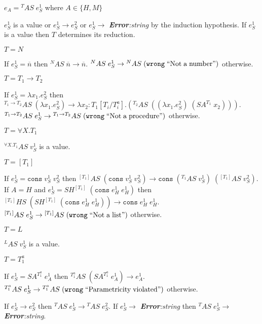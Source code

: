 \begin{case}
\label{as}
$e_{A}={^{T}A}S\;e_{S}^{1}$ where $A\in\lbrace H,M\rbrace$

$e_{S}^{1}$ is a value or $e_{S}^{1}\rightarrow e_{S}^{2}$ or $e_{S}^{1}\rightarrow$ \emph{\textbf{Error}:\;string} by the induction hypothesis.  If $e_{S}^{1}$ is a value then $T$ determines its reduction.
\begin{subcase}
$T=N$

If $e_{S}^{1}=\overline{n}$ then $^{N}AS\;\overline{n}\rightarrow\overline{n}$.  $^{N}AS\;e_{S}^{1}\rightarrow{^{N}A}S\;(\mathtt{wrong}\;\mathrm{``Not\;a\;number"})$ otherwise.
\end{subcase}
\begin{subcase}
$T=T_{1}\rightarrow T_{2}$

If $e_{S}^{1}=\lambda x_{1}.e_{S}^{2}$ then $^{T_{1}\rightarrow T_{2}}AS\;(\lambda x_{1}.e_{S}^{2})\rightarrow\lambda x_{2}:T_{1}[T_{i}/T^{a}_{i}].(^{T_{2}}AS\;((\lambda x_{1}.e_{S}^{2})\;(SA^{T_{1}}\;x_{2})))$.  $^{T_{1}\rightarrow T_{2}}AS\;e_{S}^{1}\rightarrow{^{T_{1}\rightarrow T_{2}}A}S\;(\mathtt{wrong}\;\mathrm{``Not\;a\;procedure"})$ otherwise.
\end{subcase}
\begin{subcase}
$T=\forall X.T_{1}$

$^{\forall X.T_{1}}AS\;v_{S}^{1}$ is a value.
\end{subcase}
\begin{subcase}
$T=[T_{1}]$

If $e_{S}^{1}=\mathtt{cons}\;v_{S}^{1}\;v_{S}^{2}$ then $^{[T_{1}]}AS\;(\mathtt{cons}\;v_{S}^{1}\;v_{S}^{2})\rightarrow\mathtt{cons}\;(^{T_{1}}AS\;v_{S}^{1})\;(^{[T_{1}]}AS\;v_{S}^{2})$.  If $A=H$ and $e_{S}^{1}=SH^{[T_{1}]}\;(\mathtt{cons}\;e_{H}^{1}\;e_{H}^{1})$ then $^{[T_{1}]}HS\;(SH^{[T_{1}]}\;(\mathtt{cons}\;e_{H}^{1}\;e_{H}^{1}))\rightarrow\mathtt{cons}\;e_{H}^{1}\;e_{H}^{1}$.  $^{[T_{1}]}AS\;e_{S}^{1}\rightarrow{^{[T_{1}]}A}S\;(\mathtt{wrong}\;\mathrm{``Not\;a\;list"})$ otherwise.
\end{subcase}
\begin{subcase}
$T=L$

$^{L}AS\;v_{S}^{1}$ is a value.
\end{subcase}
\begin{subcase}
$T=T_{1}^{a}$

If $e_{S}^{1}=SA^{T_{1}^{a}}\;e_{A}^{1}$ then $^{T_{1}^{a}}AS\;(SA^{T_{1}^{a}}\;e_{A}^{1})\rightarrow e_{A}^{1}$.  $^{T_{1}^{a}}AS\;e_{S}^{1}\rightarrow{^{T_{1}^{a}}A}S\;(\mathtt{wrong}\;\mathrm{``Parametricity\;violated"})$ otherwise.
\end{subcase}
If $e_{S}^{1}\rightarrow e_{S}^{2}$ then $^{T}AS\;e_{S}^{1}\rightarrow{^{T}A}S\;e_{S}^{2}$.  If $e_{S}^{1}\rightarrow$ \emph{\textbf{Error}:\;string} then $^{T}AS\;e_{S}^{1}\rightarrow$ \emph{\textbf{Error}:\;string}.
\end{case}